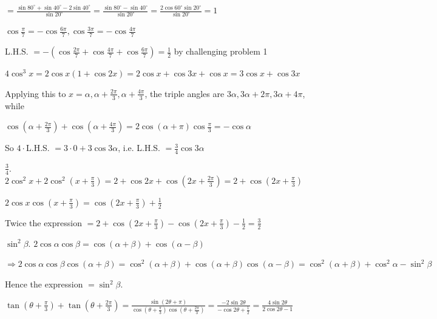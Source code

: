   $= \frac{\sin 80^\circ + \sin 40^\circ - 2\sin 40^\circ}{\sin 20^\circ} = \frac{\sin 80^\circ - \sin 40^\circ}{\sin 20^\circ}
  = \frac{2\cos 60^\circ\sin 20^\circ}{\sin 20^\circ} = 1$

\item $\cos\frac{\pi}{7} = -\cos\frac{6\pi}{7}, \cos\frac{3\pi}{7} = -\cos\frac{4\pi}{7}$

  L.H.S. $= -\left(\cos\frac{2\pi}{7} + \cos\frac{4\pi}{7} + \cos\frac{6\pi}{7}\right) = \frac{1}{2}$ by challenging problem 1

\item $4\cos^3 x = 2\cos x(1 + \cos 2x) = 2\cos x + \cos 3x + \cos x = 3\cos x + \cos 3x$

  Applying this to $x = \alpha, \alpha + \frac{2\pi}{3}, \alpha + \frac{4\pi}{3}$, the triple angles are $3\alpha, 3\alpha +
  2\pi, 3\alpha + 4\pi$, while

  $\cos\left(\alpha + \frac{2\pi}{3}\right) + \cos\left(\alpha + \frac{4\pi}{3}\right) = 2\cos(\alpha + \pi)\cos\frac{\pi}{3}
  = -\cos\alpha$

  So $4\cdot$L.H.S. $= 3\cdot 0 + 3\cos 3\alpha$, i.e. L.H.S. $= \frac{3}{4}\cos 3\alpha$

\item $\frac{3}{4}$. $2\cos^2 x + 2\cos^2\left(x + \frac{\pi}{3}\right) = 2 + \cos 2x + \cos\left(2x + \frac{2\pi}{3}\right) =
  2 + \cos\left(2x + \frac{\pi}{3}\right)$

  $2\cos x\cos\left(x + \frac{\pi}{3}\right) = \cos\left(2x + \frac{\pi}{3}\right) + \frac{1}{2}$

  Twice the expression $= 2 + \cos\left(2x + \frac{\pi}{3}\right) - \cos\left(2x + \frac{\pi}{3}\right) - \frac{1}{2} =
  \frac{3}{2}$

\item $\sin^2\beta$. $2\cos\alpha\cos\beta = \cos(\alpha + \beta) + \cos(\alpha - \beta)$

  $\Rightarrow 2\cos\alpha\cos\beta\cos(\alpha + \beta) = \cos^2(\alpha + \beta) + \cos(\alpha + \beta)\cos(\alpha - \beta) =
  \cos^2(\alpha + \beta) + \cos^2\alpha - \sin^2\beta$

  Hence the expression $= \sin^2\beta$.

\item $\tan\left(\theta + \frac{\pi}{3}\right) + \tan\left(\theta + \frac{2\pi}{3}\right) = \frac{\sin(2\theta +
  \pi)}{\cos\left(\theta + \frac{\pi}{3}\right)\cos\left(\theta + \frac{2\pi}{3}\right)} = \frac{-2\sin 2\theta}{-\cos 2\theta
  + \frac{1}{2}} = \frac{4\sin 2\theta}{2\cos 2\theta - 1}$

